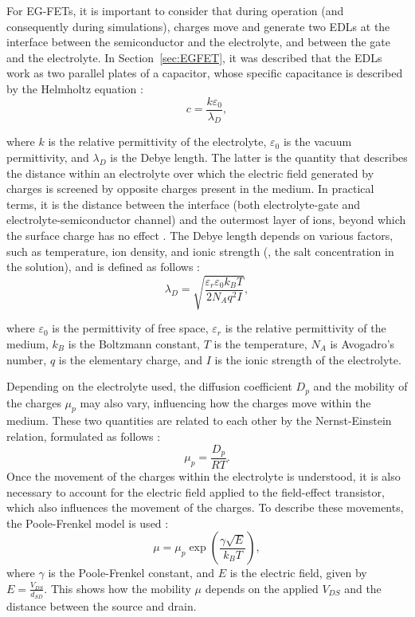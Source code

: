 For EG-FETs, it is important to consider that during operation (and consequently during simulations), charges move and generate two EDLs at the interface between the semiconductor and the electrolyte, and between the gate and the electrolyte. In Section~\ref{sec:EGFET}, it was described that the EDLs work as two parallel plates of a capacitor, whose specific capacitance is described by the Helmholtz equation \citep{kimElectrolyteGated2013}:
%
\begin{equation}
    c = \dfrac{k\varepsilon_0}{\lambda_D},
\end{equation}

where $k$ is the relative permittivity of the electrolyte, $\varepsilon_0$ is the vacuum permittivity, and $\lambda_D$ is the Debye length. The latter is the quantity that describes the distance within an electrolyte over which the electric field generated by charges is screened by opposite charges present in the medium. In practical terms, it is the distance between the interface (both electrolyte-gate and electrolyte-semiconductor channel) and the outermost layer of ions, beyond which the surface charge has no effect \citep{nakatsukaAptamer2018}. The Debye length depends on various factors, such as temperature, ion density, and ionic strength (\ie{}, the salt concentration in the solution), and is defined as follows \citep{shkodraElectrolytegated2021}:
\begin{equation}
    \lambda_D = \sqrt{\dfrac{\varepsilon_r \varepsilon_0 k_B T}{2N_Aq^2I}},
\end{equation}

where $\varepsilon_0$ is the permittivity of free space, $\varepsilon_r$ is the relative permittivity of the medium, $k_B$ is the Boltzmann constant, $T$ is the temperature, $N_A$ is Avogadro's number, $q$ is the elementary charge, and $I$ is the ionic strength of the electrolyte.

Depending on the electrolyte used, the diffusion coefficient $D_p$ and the mobility of the charges $\mu_p$ may also vary, influencing how the charges move within the medium. These two quantities are related to each other by the Nernst-Einstein relation, formulated as follows \citep{delavariNernst2021}:
%
\begin{equation}
    \mu_p = \dfrac{D_p}{RT}.
\end{equation}
%
Once the movement of the charges within the electrolyte is understood, it is also necessary to account for the electric field applied to the field-effect transistor, which also influences the movement of the charges. To describe these movements, the Poole-Frenkel model is used \citep{gillDrift1972,delavariNernst2021}:
%
\begin{equation}
    \mu = \mu_p\exp\left(\dfrac{\gamma \sqrt{E}}{k_BT}\right),
\end{equation}
%
where $\gamma$ is the Poole-Frenkel constant, and $E$ is the electric field, given by $E = \frac{V_{DS}}{d_{SD}}$. This shows how the mobility $\mu$ depends on the applied $V_{DS}$ and the distance between the source and drain.

